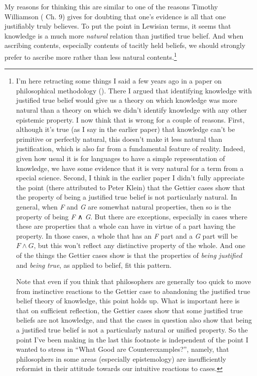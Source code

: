 \documentclass[
  11pt,
  letterpaper,
  DIV=11,
  numbers=noendperiod,
  twoside]{scrartcl}
\begin{document}
My reasons for thinking this are similar to one of the reasons Timothy
Williamson ( Ch. 9)
gives for doubting that one's evidence is all that one justifiably truly
believes. To put the point in Lewisian terms, it seems that knowledge is
a much more \emph{natural} relation than justified true belief. And when
ascribing contents, especially contents of tacitly held beliefs, we
should strongly prefer to ascribe more rather than less natural
contents.\footnote{I'm here retracting some things I said a few years
  ago in a paper on philosophical methodology
  (). There I
  argued that identifying knowledge with justified true belief would
  give us a theory on which knowledge was more natural than a theory on
  which we didn't identify knowledge with any other epistemic property.
  I now think that is wrong for a couple of reasons. First, although
  it's true (as I say in the earlier paper) that knowledge can't be
  primitive or perfectly natural, this doesn't make it less natural than
  justification, which is also far from a fundamental feature of
  reality. Indeed, given how usual it is for languages to have a simple
  representation of knowledge, we have some evidence that it is very
  natural for a term from a special science. Second, I think in the
  earlier paper I didn't fully appreciate the point (there attributed to
  Peter Klein) that the Gettier cases show that the property of being a
  justified true belief is not particularly natural. In general, when
  \emph{F} and \emph{G} are somewhat natural properties, then so is the
  property of being \emph{F} ∧ \emph{G}. But there are exceptions,
  especially in cases where these are properties that a whole can have
  in virtue of a part having the property. In those cases, a whole that
  has an \emph{F} part and a \emph{G} part will be \(F \wedge G\), but
  this won't reflect any distinctive property of the whole. And one of
  the things the Gettier cases show is that the properties of
  \emph{being justified} and \emph{being true}, as applied to belief,
  fit this pattern.

  Note that even if you think that philosophers are generally too quick
  to move from instinctive reactions to the Gettier case to abandoning
  the justified true belief theory of knowledge, this point holds up.
  What is important here is that on sufficient reflection, the Gettier
  cases show that some justified true beliefs are not knowledge, and
  that the cases in question also show that being a justified true
  belief is not a particularly natural or unified property. So the point
  I've been making in the last this footnote is independent of the point
  I wanted to stress in ``What Good are Counterexamples?'', namely, that
  philosophers in some areas (especially epistemology) are
  insufficiently reformist in their attitude towards our intuitive
  reactions to cases.}
\end{document}
